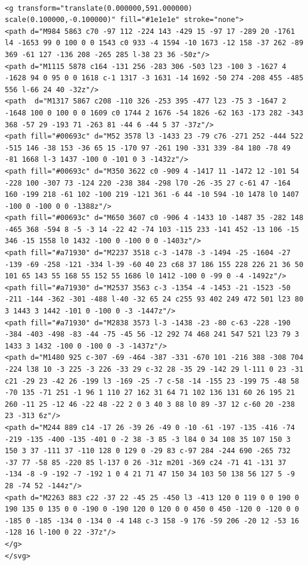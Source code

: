 \lstset{language=JavaScript}
\begin{lstlisting}[label={lst:logoaghsvg},caption={Logo AGH w zapisie SVG.}]

<g transform="translate(0.000000,591.000000) scale(0.100000,-0.100000)" fill="#1e1e1e" stroke="none">
<path d="M984 5863 c70 -97 112 -224 143 -429 15 -97 17 -289 20 -1761 l4 -1653 99 0 100 0 0 1543 c0 933 -4 1594 -10 1673 -12 158 -37 262 -89 369 -61 127 -136 208 -265 285 l-38 23 36 -50z"/>
<path d="M1115 5878 c164 -131 256 -283 306 -503 l23 -100 3 -1627 4 -1628 94 0 95 0 0 1618 c-1 1317 -3 1631 -14 1692 -50 274 -208 455 -485 556 l-66 24 40 -32z"/>
<path  d="M1317 5867 c208 -110 326 -253 395 -477 l23 -75 3 -1647 2 -1648 100 0 100 0 0 1609 c0 1744 2 1676 -54 1826 -62 163 -173 282 -343 368 -57 29 -193 71 -263 81 -44 6 -44 5 37 -37z"/>
<path fill="#00693c" d="M52 3578 l3 -1433 23 -79 c76 -271 252 -444 522 -515 146 -38 153 -36 65 15 -170 97 -261 190 -331 339 -84 180 -78 49 -81 1668 l-3 1437 -100 0 -101 0 3 -1432z"/>
<path fill="#00693c" d="M350 3622 c0 -909 4 -1417 11 -1472 12 -101 54 -228 100 -307 73 -124 220 -238 384 -298 l70 -26 -35 27 c-61 47 -164 160 -199 218 -61 102 -100 219 -121 361 -6 44 -10 594 -10 1478 l0 1407 -100 0 -100 0 0 -1388z"/>
<path fill="#00693c" d="M650 3607 c0 -906 4 -1433 10 -1487 35 -282 148 -465 368 -594 8 -5 -3 14 -22 42 -74 103 -115 233 -141 452 -13 106 -15 346 -15 1558 l0 1432 -100 0 -100 0 0 -1403z"/>
<path fill="#a71930" d="M2237 3518 c-3 -1478 -3 -1494 -25 -1604 -27 -139 -69 -258 -121 -334 l-39 -60 40 23 c68 37 186 155 228 226 21 36 50 101 65 143 55 168 55 152 55 1686 l0 1412 -100 0 -99 0 -4 -1492z"/>
<path fill="#a71930" d="M2537 3563 c-3 -1354 -4 -1453 -21 -1523 -50 -211 -144 -362 -301 -488 l-40 -32 65 24 c255 93 402 249 472 501 l23 80 3 1443 3 1442 -101 0 -100 0 -3 -1447z"/>
<path fill="#a71930" d="M2838 3573 l-3 -1438 -23 -80 c-63 -228 -190 -384 -403 -498 -83 -44 -75 -45 56 -12 292 74 468 241 547 521 l23 79 3 1433 3 1432 -100 0 -100 0 -3 -1437z"/>
<path d="M1480 925 c-307 -69 -464 -387 -331 -670 101 -216 388 -308 704 -224 l38 10 -3 225 -3 226 -33 29 c-32 28 -35 29 -142 29 l-111 0 23 -31 c21 -29 23 -42 26 -199 l3 -169 -25 -7 c-58 -14 -155 23 -199 75 -48 58 -70 135 -71 251 -1 96 1 110 27 162 31 64 71 102 136 131 60 26 195 21 260 -11 25 -12 46 -22 48 -22 2 0 3 40 3 88 l0 89 -37 12 c-60 20 -238 23 -313 6z"/>
<path d="M244 889 c14 -17 26 -39 26 -49 0 -10 -61 -197 -135 -416 -74 -219 -135 -400 -135 -401 0 -2 38 -3 85 -3 l84 0 34 108 35 107 150 3 150 3 37 -111 37 -110 128 0 129 0 -29 83 c-97 284 -244 690 -265 732 -37 77 -58 85 -220 85 l-137 0 26 -31z m201 -369 c24 -71 41 -131 37 -134 -8 -9 -192 -7 -192 1 0 4 21 71 47 150 34 103 50 138 56 127 5 -9 28 -74 52 -144z"/>
<path d="M2263 883 c22 -37 22 -45 25 -450 l3 -413 120 0 119 0 0 190 0 190 135 0 135 0 0 -190 0 -190 120 0 120 0 0 450 0 450 -120 0 -120 0 0 -185 0 -185 -134 0 -134 0 -4 148 c-3 158 -9 176 -59 206 -20 12 -53 16 -128 16 l-100 0 22 -37z"/>
</g>
</svg>

\end{lstlisting}

